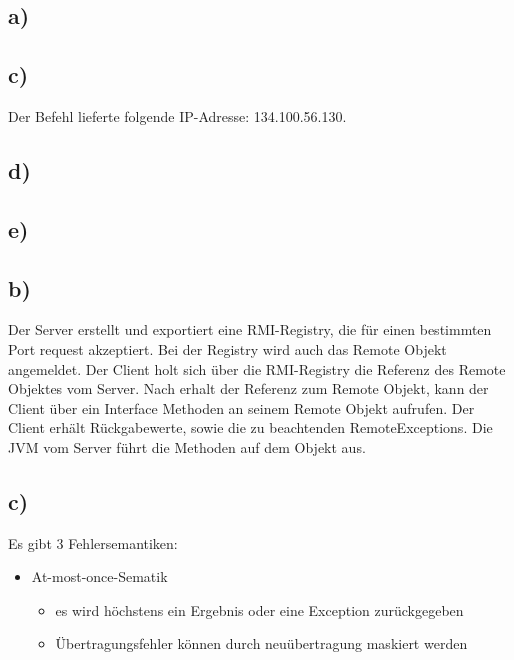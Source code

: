 \documentclass[ngerman]{fbi-aufgabenblatt}
\begin{document}
	\setcounter{section}{0}

	
	
	\subsection*{a)}
	
	\subsection*{c)}

  Der Befehl 
  lieferte folgende IP-Adresse: 134.100.56.130.
  \newline

	\subsection*{d)}

	\subsection*{e)}

	
	\subsection*{b)}
  Der Server erstellt und exportiert eine RMI-Registry, die für einen bestimmten 
  Port request akzeptiert. Bei der Registry wird auch das Remote Objekt
  angemeldet.  Der Client holt sich über die RMI-Registry die Referenz des
  Remote Objektes vom Server. Nach erhalt der Referenz zum Remote Objekt,
  kann der Client über ein Interface Methoden an seinem Remote Objekt aufrufen.
  Der Client erhält Rückgabewerte, sowie die zu beachtenden RemoteExceptions.
  Die JVM vom Server führt die Methoden auf dem Objekt aus.

	\subsection*{c)}
  Es gibt 3 Fehlersemantiken:

  \begin{itemize}
    \item At-most-once-Sematik
      \begin{itemize}
        \item es wird höchstens ein Ergebnis oder eine Exception zurückgegeben
        \item Übertragungsfehler können durch neuübertragung maskiert werden
      \end{itemize}
  \end{itemize}
\end{document}
